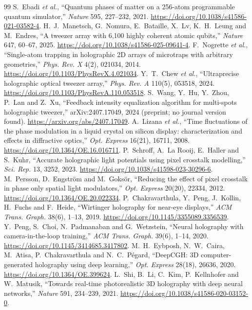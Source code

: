 \begin{thebibliography}{99}
 S.~Ebadi \emph{et al.}, ``Quantum phases of matter on a 256-atom programmable quantum simulator,'' \emph{Nature} 595, 227--232, 2021. \url{https://doi.org/10.1038/s41586-021-03582-4}.
 H.~J.~Manetsch, G.~Nomura, E.~Bataille, X.~Lv, K.~H.~Leung and M.~Endres, ``A tweezer array with 6,100 highly coherent atomic qubits,'' \emph{Nature} 647, 60--67, 2025. \url{https://doi.org/10.1038/s41586-025-09641-4}.
 F.~Nogrette \emph{et al.}, ``Single-atom trapping in holographic 2D arrays of microtraps with arbitrary geometries,'' \emph{Phys. Rev. X} 4(2), 021034, 2014. \url{https://doi.org/10.1103/PhysRevX.4.021034}.
 Y.~T.~Chew \emph{et al.}, ``Ultraprecise holographic optical tweezer array,'' \emph{Phys. Rev. A} 110(5), 053518, 2024. \url{https://doi.org/10.1103/PhysRevA.110.053518}.
 S.~Wang, Y.~Hu, Y.~Zhou, P.~Lan and Z.~Xu, ``Feedback intensity equalization algorithm for multi-spots holographic tweezer,'' arXiv:2407.17049, 2024 (preprint; no journal version found). \url{https://arxiv.org/abs/2407.17049}.
 A.~Lizana \emph{et al.}, ``Time fluctuations of the phase modulation in a liquid crystal on silicon display: characterization and effects in diffractive optics,'' \emph{Opt. Express} 16(21), 16711, 2008. \url{https://doi.org/10.1364/OE.16.016711}.
 P.~Schroff, A.~La Rooij, E.~Haller and S.~Kuhr, ``Accurate holographic light potentials using pixel crosstalk modelling,'' \emph{Sci. Rep.} 13, 3252, 2023. \url{https://doi.org/10.1038/s41598-023-30296-6}.
 M.~Persson, D.~Engstr\"om and M.~Goks\"or, ``Reducing the effect of pixel crosstalk in phase only spatial light modulators,'' \emph{Opt. Express} 20(20), 22334, 2012. \url{https://doi.org/10.1364/OE.20.022334}.
 P.~Chakravarthula, Y.~Peng, J.~Kollin, H.~Fuchs and F.~Heide, ``Wirtinger holography for near-eye displays,'' \emph{ACM Trans. Graph.} 38(6), 1--13, 2019. \url{https://doi.org/10.1145/3355089.3356539}.
 Y.~Peng, S.~Choi, N.~Padmanaban and G.~Wetzstein, ``Neural holography with camera-in-the-loop training,'' \emph{ACM Trans. Graph.} 39(6), 1--14, 2020. \url{https://doi.org/10.1145/3414685.3417802}.
 M.~H.~Eybposh, N.~W.~Caira, M.~Atisa, P.~Chakravarthula and N.~C.~P\'egard, ``DeepCGH: 3D computer-generated holography using deep learning,'' \emph{Opt. Express} 28(18), 26636, 2020. \url{https://doi.org/10.1364/OE.399624}.
 L.~Shi, B.~Li, C.~Kim, P.~Kellnhofer and W.~Matusik, ``Towards real-time photorealistic 3D holography with deep neural networks,'' \emph{Nature} 591, 234--239, 2021. \url{https://doi.org/10.1038/s41586-020-03152-0}.

\end{thebibliography}
